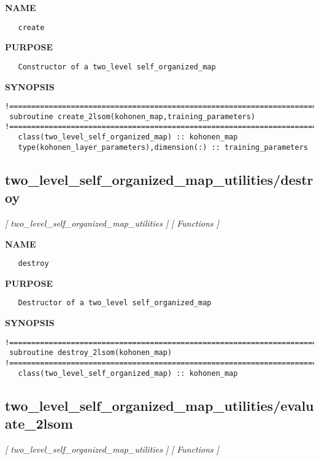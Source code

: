 \documentclass{article}
\begin{document}
\label{ch:robo67}
\label{ch:two_level_self_organized_map_utilities_create}
\textbf{NAME}
\begin{verbatim}
   create
\end{verbatim}
\textbf{PURPOSE}
\begin{verbatim}
   Constructor of a two_level self_organized_map 
\end{verbatim}
\textbf{SYNOPSIS}
\begin{verbatim}
!========================================================================================
 subroutine create_2lsom(kohonen_map,training_parameters)
!========================================================================================
   class(two_level_self_organized_map) :: kohonen_map
   type(kohonen_layer_parameters),dimension(:) :: training_parameters
\end{verbatim}
\newpage
\subsection{two\_level\_self\_organized\_map\_utilities/destroy}
\textsl{[ two\_level\_self\_organized\_map\_utilities ]}
\textsl{[ Functions ]}

\label{ch:robo68}
\label{ch:two_level_self_organized_map_utilities_destroy}
\textbf{NAME}
\begin{verbatim}
   destroy
\end{verbatim}
\textbf{PURPOSE}
\begin{verbatim}
   Destructor of a two_level self_organized_map 
\end{verbatim}
\textbf{SYNOPSIS}
\begin{verbatim}
!========================================================================================
 subroutine destroy_2lsom(kohonen_map)
!========================================================================================
   class(two_level_self_organized_map) :: kohonen_map
\end{verbatim}
\newpage
\subsection{two\_level\_self\_organized\_map\_utilities/evaluate\_2lsom}
\textsl{[ two\_level\_self\_organized\_map\_utilities ]}
\textsl{[ Functions ]}
\end{document}
